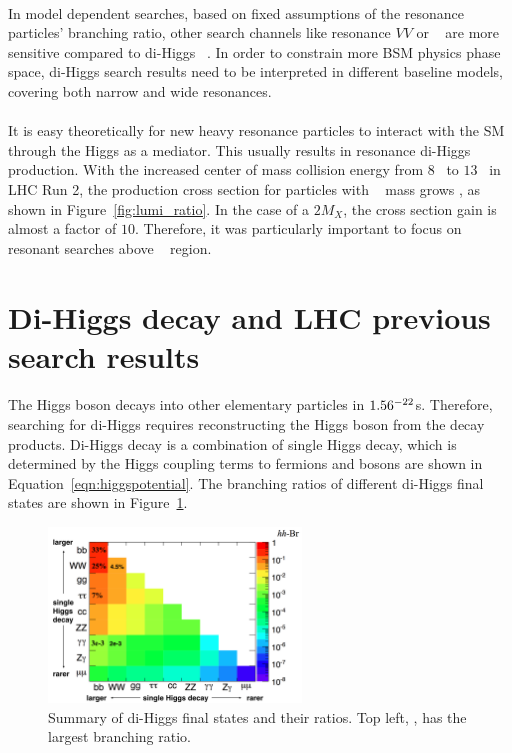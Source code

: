 \paragraph{}
In model dependent searches, based on fixed assumptions of the resonance particles' branching ratio, other search channels like resonance $VV$ or \ttbar~ are more sensitive compared to di-Higgs ~\cite{Cavaliere:2203605}. In order to constrain more BSM physics phase space, di-Higgs search results need to be interpreted in different baseline models, covering both narrow and wide resonances.

\paragraph{}
It is easy theoretically for new heavy resonance particles to interact with the SM through the Higgs as a mediator.
This usually results in resonance di-Higgs production. 
With the increased center of mass collision energy from $8$\TeV~ to $13$\TeV~ in LHC Run 2, the production cross section for particles with \TeV~ mass grows , as shown in Figure~\ref{fig:lumi_ratio}.
In the case of a $2$\TeV $M_X$, the cross section gain is almost a factor of $10$. 
Therefore, it was particularly important to focus on resonant searches above \TeV~ region.


\section{Di-Higgs decay and LHC previous search results}
\paragraph{}
The Higgs boson decays into other elementary particles in $1.56 \time 10 ^{-22}$s.
Therefore, searching for di-Higgs requires reconstructing the Higgs boson from the decay products.
Di-Higgs decay is a combination of single Higgs decay, which is determined by the Higgs coupling terms to fermions and bosons are shown in Equation~\ref{eqn:higgspotential}. 
The branching ratios of different di-Higgs final states are shown in Figure~\ref{fig:HH_BR}.

\begin{figure}[htbp!]
  \centering
  \includegraphics[width=0.6\textwidth]{figures/theory/HH_BR}
  \caption{Summary of di-Higgs final states and their ratios. Top left, \bbbb, has the largest branching ratio.}
  \label{fig:HH_BR}
\end{figure}


